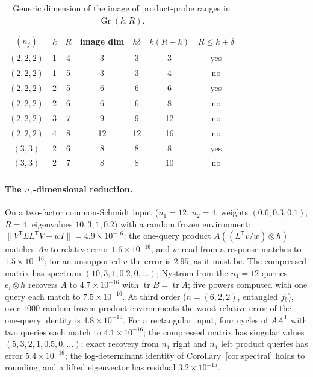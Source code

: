 \documentclass[11pt,a4paper]{article}
\theoremstyle{definition}
\theoremstyle{remark}
\numberwithin{equation}{section}
\newcommand{\T}{{\mathsf T}}
\newcommand{\tr}{\operatorname{tr}}
\newcommand{\Gr}{\operatorname{Gr}}
\newcommand{\norm}[1]{\lVert#1\rVert}
\begin{document}
\begin{table}[htbp]
\centering\small
\begin{tabular}{@{}ccccccc@{}}\toprule
$(n_j)$ & $k$ & $R$ & image dim & $k\delta$ & $k(R-k)$ & $R\le k+\delta$\\\midrule
$(2,2,2)$ & 1 & 4 & 3 & 3 & 3 & yes\\
$(2,2,2)$ & 1 & 5 & 3 & 3 & 4 & no\\
$(2,2,2)$ & 2 & 5 & 6 & 6 & 6 & yes\\
$(2,2,2)$ & 2 & 6 & 6 & 6 & 8 & no\\
$(2,2,2)$ & 3 & 7 & 9 & 9 & 12 & no\\
$(2,2,2)$ & 4 & 8 & 12 & 12 & 16 & no\\
$(3,3)$   & 2 & 6 & 8 & 8 & 8 & yes\\
$(3,3)$   & 2 & 7 & 8 & 8 & 10 & no\\\bottomrule
\end{tabular}
\caption{Generic dimension of the image of product-probe ranges in $\Gr(k,R)$.}
\label{tab:grass}
\end{table}
\paragraph{The $n_1$-dimensional reduction.} On a two-factor common-Schmidt
input ($n_1=12$, $n_2=4$, weights $(0.6,0.3,0.1)$, $R=4$, eigenvalues
$10,3,1,0.2$) with a random frozen environment:
$\norm{V^\T LL^\T V-wI}=4.9\times10^{-16}$; the one-query product
$A((L^\T v/w)\otimes h)$ matches $Av$ to relative error $1.6\times10^{-16}$, and
$w$ read from a response matches to $1.5\times10^{-16}$; for an unsupported $v$
the error is $2.95$, as it must be. The compressed matrix has spectrum
$(10,3,1,0.2,0,\ldots)$; Nystr\"om from the $n_1=12$ queries $e_i\otimes h$
recovers $A$ to $4.7\times10^{-16}$ with $\tr B=\tr A$; five powers computed with
one query each match to $7.5\times10^{-16}$. At third order ($n=(6,2,2)$, entangled
$f_b$), over $1000$ random frozen product environments the worst relative
error of the one-query identity is $4.8\times10^{-15}$. For a rectangular input,
four cycles of $AA^\T$ with two queries each match to $4.1\times10^{-16}$; the
compressed matrix has singular values $(5,3,2,1,0.5,0,\ldots)$; exact recovery
from $n_1$ right and $n_1$ left product queries has error $5.4\times10^{-16}$; the
log-determinant identity of Corollary~\ref{cor:spectral} holds to rounding, and
a lifted eigenvector has residual $3.2\times10^{-15}$.
\end{document}
